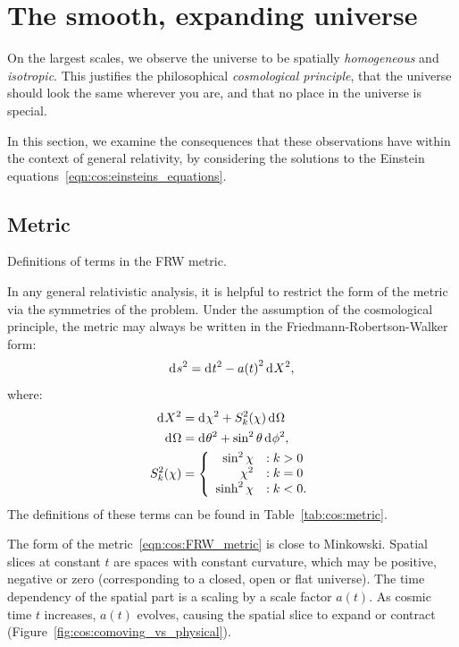 \section{The smooth, expanding universe}
On the largest scales, we observe the universe to be spatially {\em homogeneous\/} and {\em isotropic}. This justifies the philosophical {\em cosmological principle}, that the universe should look the same wherever you are, and that no place in the universe is special. 

In this section, we examine the consequences that these observations have within the context of general relativity, by considering the solutions to the Einstein equations~\eqref{eqn:cos:einsteins_equations}.

\subsection{Metric}
\begin{table}[tp]
  \centering
  
\caption{Definitions of terms in the FRW metric.}\label{tab:cos:metric}
\end{table}

In any general relativistic analysis, it is helpful to restrict the form of the metric via the symmetries of the problem.
Under the assumption of the cosmological principle, the metric may always be written in the Friedmann-Robertson-Walker form:
\begin{equation}
  \operatorname{d}^{}\!{s}^2 = \operatorname{d}^{}\!{t}^2 - a{(t)}^2 \operatorname{d}^{}\!{X}^2,
  \label{eqn:cos:FRW_metric}
\end{equation}
where:
\begin{align}
  \operatorname{d}^{}\!{X}^2 &= \operatorname{d}^{}\!{\chi}^2 + S_k^2{(\chi)} \operatorname{d}^{}\!{\Omega}
  \label{eqn:cos:space_element}\\
  \operatorname{d}^{}\!{\Omega} &= \operatorname{d}^{}\!{\theta}^2 + \sin^2\theta \operatorname{d}^{}\!{\phi}^2,
  \label{eqn:cos:angle_element}\\
  S_k^2(\chi) &=
  \left\{
  \begin{array}{rl}
    \sin^2\chi &: k>0 \\
    \chi^2 &: k=0 \\
    \sinh^2\chi &: k<0. \\
  \end{array}
  \right.\label{eqn:cos:S_def}
\end{align}
The definitions of these terms can be found in Table~\ref{tab:cos:metric}. 

The form of the metric~\eqref{eqn:cos:FRW_metric} is close to Minkowski. Spatial slices at constant \(t\) are spaces with constant curvature, which may be positive, negative or zero (corresponding to a closed, open or flat universe). The time dependency of the spatial part is a scaling by a scale factor \(a(t)\). As cosmic time \(t\) increases, \(a(t)\) evolves, causing the spatial slice to expand or contract (Figure~\ref{fig:cos:comoving_vs_physical}). 



